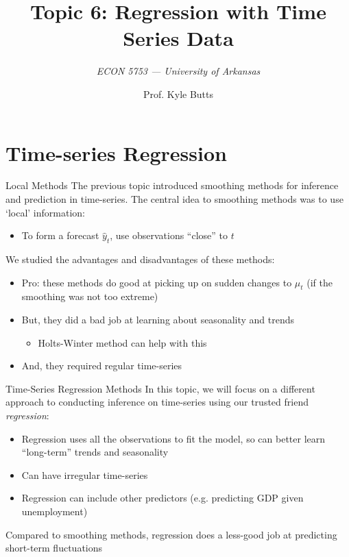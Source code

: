 \documentclass[aspectratio=169,t,11pt,table]{beamer}
\title{Topic 6: Regression with Time Series Data}
\subtitle{\it  ECON 5753 — University of Arkansas}
\author{Prof. Kyle Butts}
\begin{document}
\begin{frame}
\maketitle

\end{frame}

\section{Time-series Regression}

\begin{frame}{Local Methods}
  The previous topic introduced smoothing methods for inference and prediction in time-series. The central idea to smoothing methods was to use `local' information:
  \begin{itemize}
    \item To form a forecast $\hat{y}_t$, use observations ``close'' to $t$
  \end{itemize}

  \bigskip
  We studied the advantages and disadvantages of these methods: 
  \begin{itemize}
    \item Pro: these methods do good at picking up on sudden changes to $\mu_t$ (if the smoothing was not too extreme)

    \item But, they did a bad job at learning about seasonality and trends
    \begin{itemize}
      \item Holts-Winter method can help with this
    \end{itemize}

    \item And, they required \alert{regular time-series}
  \end{itemize}
\end{frame}

\begin{frame}{Time-Series Regression Methods}
  In this topic, we will focus on a different approach to conducting inference on time-series using our trusted friend \emph{regression}: 
  \begin{itemize}
    \item Regression uses all the observations to fit the model, so can better learn ``long-term'' trends and seasonality
    
    \item Can have irregular time-series
    
    \item Regression can include other predictors (e.g. predicting GDP given unemployment)
  \end{itemize}

  \bigskip
  Compared to smoothing methods, regression does a less-good job at predicting short-term fluctuations 
\end{frame}
\end{document}
